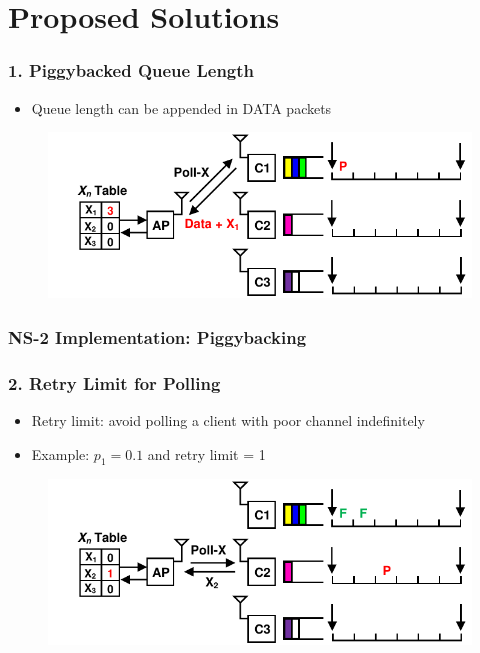 \documentclass{beamer}
\begin{document}
\section{Proposed Solutions}

\begin{frame}
\frametitle{1. Piggybacked Queue Length}
\begin{itemize}
\item Queue length can be appended in DATA packets
\end{itemize}
\begin{figure}
\centering
\includegraphics[scale=0.8]{piggyback_1.pdf}
\end{figure}
\end{frame}

\begin{frame}
\frametitle{NS-2 Implementation: Piggybacking}
\end{frame}

\begin{frame}
\frametitle{2. Retry Limit for Polling}
\begin{itemize}
\item Retry limit: avoid polling a client with poor channel indefinitely
\item Example: $p_1=0.1$ and retry limit = 1
\end{itemize}
\begin{figure}
\centering
\includegraphics[scale=0.8]{retry_1.pdf}
\end{figure}
\end{frame}
\end{document}
